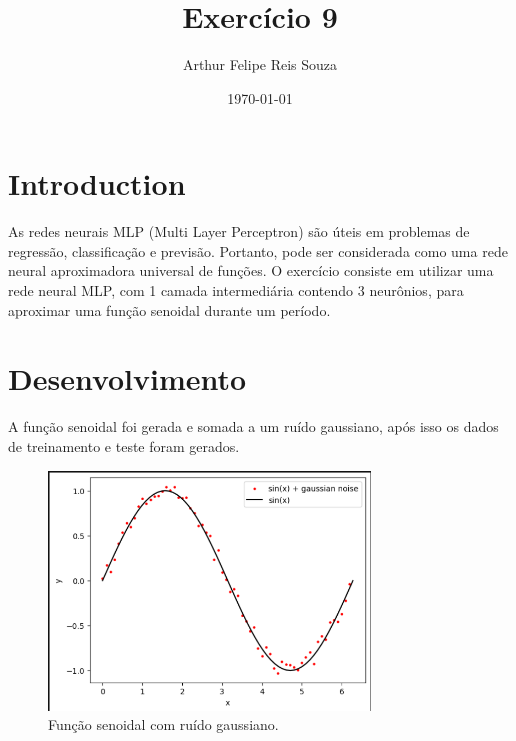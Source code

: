 \documentclass{article}
\begin{document}
\title{Exercício 9} 
\author{Arthur Felipe Reis Souza}
\date{\today}
\maketitle


\section{Introduction}

\vspace{10pt}

As redes neurais MLP (Multi Layer Perceptron) são úteis em problemas de regressão, classificação e previsão. Portanto, pode ser considerada como uma rede neural aproximadora universal de funções. O exercício consiste em utilizar uma rede neural MLP, com 1 camada intermediária contendo 3 neurônios, para aproximar uma função senoidal durante um período.

\section{Desenvolvimento}

\vspace{10pt}

A função senoidal foi gerada e somada a um ruído gaussiano, após isso os dados de treinamento e teste foram gerados.

\vspace{10pt}

\begin{figure}[h]

    \centering
    \includegraphics[height=2.5in]{func_sin_noise.png}
    \caption{Função senoidal com ruído gaussiano.}
    \label{fig:example}
    
\end{figure}

\vspace{10pt}
\end{document}
